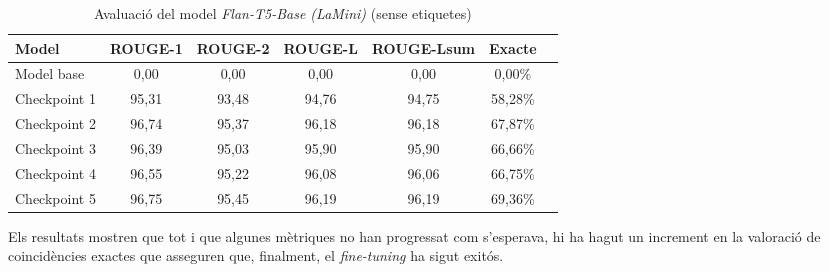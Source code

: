 \begin{table}[H]
    \centering
    \begin{tabular}{lcccccc}
    \toprule
    Model & ROUGE-1 & ROUGE-2 & ROUGE-L & ROUGE-Lsum & Exacte \\
    \midrule
    Model base   & 0,00  & 0,00  & 0,00  & 0,00  & 0,00\% \\
    Checkpoint 1 & 95,31 & 93,48 & 94,76 & 94,75 & 58,28\% \\
    Checkpoint 2 & 96,74 & 95,37 & 96,18 & 96,18 & 67,87\% \\
    Checkpoint 3 & 96,39 & 95,03 & 95,90 & 95,90 & 66,66\% \\
    Checkpoint 4 & 96,55 & 95,22 & 96,08 & 96,06 & 66,75\% \\
    Checkpoint 5 & 96,75 & 95,45 & 96,19 & 96,19 & 69,36\% \\
    \bottomrule
    \end{tabular}
    \caption[Avaluació del model \textit{Flan-T5-Base (LaMini)}]{Avaluació del model \textit{Flan-T5-Base (LaMini)} (sense etiquetes)}
\end{table}

Els resultats mostren que tot i que algunes mètriques no han progressat com s'esperava, hi ha hagut un increment en la valoració de coincidències exactes que asseguren que, finalment, el \textit{fine-tuning} ha sigut exitós.




